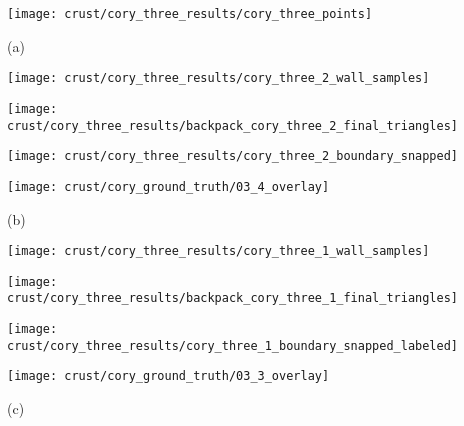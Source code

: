 \documentclass[journal]{IEEEtran}
\begin{document}
\begin{figure*}[t]

\begin{minipage}[b]{1.0\linewidth}
  \centering
  \centerline{\texttt{[image: crust/cory\_three\_results/cory\_three\_points]}}
\end{minipage}
\centerline{(a)}
\linebreak

\begin{minipage}[b]{0.24\linewidth}
  \centering
  \centerline{\texttt{[image: crust/cory\_three\_results/cory\_three\_2\_wall\_samples]}}
\end{minipage}
\hfill
\begin{minipage}[b]{0.24\linewidth}
  \centering
  \centerline{\texttt{[image: crust/cory\_three\_results/backpack\_cory\_three\_2\_final\_triangles]}}
\end{minipage}
\hfill
\begin{minipage}[b]{0.24\linewidth}
  \centering
  \centerline{\texttt{[image: crust/cory\_three\_results/cory\_three\_2\_boundary\_snapped]}}
\end{minipage}
\hfill
\begin{minipage}[b]{0.24\linewidth}
  \centering
  \centerline{\texttt{[image: crust/cory\_ground\_truth/03\_4\_overlay]}}
\end{minipage}
\centerline{(b)}
\linebreak

\begin{minipage}[b]{0.24\linewidth}
  \centering
  \centerline{\texttt{[image: crust/cory\_three\_results/cory\_three\_1\_wall\_samples]}}
\end{minipage}
\hfill
\begin{minipage}[b]{0.24\linewidth}
  \centering
  \centerline{\texttt{[image: crust/cory\_three\_results/backpack\_cory\_three\_1\_final\_triangles]}}
\end{minipage}
\hfill
\begin{minipage}[b]{0.24\linewidth}
  \centering
  \centerline{\texttt{[image: crust/cory\_three\_results/cory\_three\_1\_boundary\_snapped\_labeled]}}
\end{minipage}
\hfill
\begin{minipage}[b]{0.24\linewidth}
  \centering
  \centerline{\texttt{[image: crust/cory\_ground\_truth/03\_3\_overlay]}}
\end{minipage}
\centerline{(c)}
\linebreak


\end{figure*}
\end{document}
